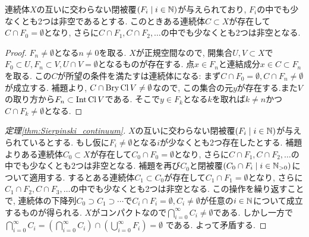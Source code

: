 \documentclass[uplatex, dvipdfmx, a4paper, 12pt, class=jsbook, crop=false]{standalone}
\begin{document}
\begin{lemma}
	連続体$ X $の互いに交わらない閉被覆$ \setfamily{F_i}{i \in \N} $が与えられており, $ F_i $の中でも少なくとも2つは非空であるとする. このときある連続体$ C \subset X $が存在して$ C \cap F_0 = \emptyset $となり, さらに$ C \cap F_1, C \cap F_2, \ldots $の中でも少なくとも2つは非空となる.
\end{lemma}
\begin{proof}
	$ F_n \neq \emptyset $となる$ n \neq 0 $を取る. $ X $が正規空間なので, 開集合$ U, V \subset X $で$ F_0 \subset U, F_n \subset V, U \cap V = \emptyset $となるものが存在する. 点$ x \in F_n $と連結成分$ x \in C \subset F_n $を取る. この$ C $が所望の条件を満たすは連続体になる: まず$ C \cap F_0 = \emptyset, C \cap F_n \neq \emptyset $が成立する. 補題より, $ C \cap \mathop{\mathrm{Bry}}\nolimits\mathop{\mathrm{Cl}}\nolimits V \neq \emptyset $なので, この集合の元$ y $が存在する.また$ V $の取り方から$ F_n \subset \mathop{\mathrm{Int}}\nolimits \mathop{\mathrm{Cl}}\nolimits V $である. そこで$ y \in F_k $となる$ k $を取れば$ k \neq n $かつ$ C \cap F_k \neq \emptyset $となる.
\end{proof}

\begin{proof}[定理\ref{thm:Sierpinski_continuum}]
	$ X $の互いに交わらない閉被覆$ \setfamily{F_i}{i \in \N} $が与えられているとする. もし仮に$ F_i \neq \emptyset $となる$ i $が少なくとも2つ存在したとする. 補題よりある連続体$ C_0 \subset X $が存在して$ C_0 \cap  F_0 = \emptyset$となり, さらに$ C \cap F_1, C \cap F_2, \ldots $の中でも少なくとも2つは非空となる. 補題を再び$ C_0 $と閉被覆$ \setfamily{C_0 \cap F_i}{i \in \N_{>0}} $について適用する. するとある連続体$ C_1 \subset C_0 $が存在して$ C_1 \cap  F_1 = \emptyset$となり, さらに$ C_1 \cap F_2, C \cap F_3, \ldots $の中でも少なくとも2つは非空となる. この操作を繰り返すことで, 連続体の下降列$ C_0 \supset C_1 \supset \cdots $で$ C_i \cap F_i = \emptyset, C_i \neq \emptyset $が任意の$ i \in \mathbb{N} $について成立するものが得られる. $ X $がコンパクトなので$ \bigcap_{i=0}^{\infty} C_i \neq \emptyset $である. しかし一方で$ \bigcap_{i=0}^{\infty} C_i = \left(\bigcap_{i=0}^{\infty} C_i \right) \cap \left( \bigcup_{i=0}^{\infty} F_i \right) = \emptyset $ である. よって矛盾する.
\end{proof}


\end{document}

